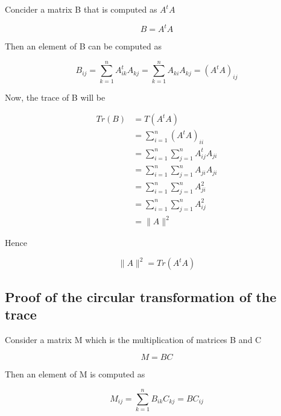 \documentclass{article}
\begin{document}
    Concider a matrix B that is computed as $A^tA$

    \begin{equation*}
        B = A^tA
    \end{equation*}

    Then an element of B can be computed as

    \begin{equation*}
        B_{ij} = \sum_{k=1}^n A_{ik}^t A_{kj} = \sum_{k=1}^n A_{ki} A_{kj} = (A^tA)_{ij}
    \end{equation*}

    Now, the trace of B will be

    \begin{equation*}
        \begin{aligned}
            Tr(B) &= T(A^tA)\\
                  &= \sum_{i=1}^n (A^tA)_{ii}\\
                  &= \sum_{i=1}^n \sum_{j=1}^n A_{ij}^t A_{ji}\\
                  &= \sum_{i=1}^n \sum_{j=1}^n A_{ji} A_{ji}\\
                  &= \sum_{i=1}^n \sum_{j=1}^n A_{ji}^2 \\
                  &= \sum_{i=1}^n \sum_{j=1}^n A_{ij}^2 \\
                  &= \lVert A \rVert^2
        \end{aligned}
    \end{equation*}

    Hence

    \begin{equation*}
        \lVert A \rVert^2 = Tr(A^tA)
    \end{equation*}

    \subsection{Proof of the circular transformation of the trace} \label{circular_trace}

    Consider a matrix M which is the multiplication of matrices B and C

    \begin{equation*}
        M = BC
    \end{equation*}

    Then an element of M is computed as

    \begin{equation*}
        M_{ij} = \sum_{k=1}^n B_{ik} C_{kj} = BC_{ij}
    \end{equation*}
\end{document}
